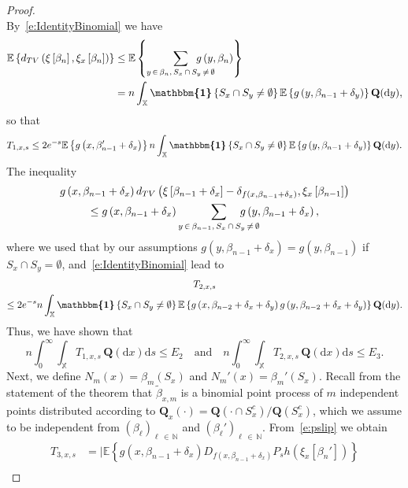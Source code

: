 \documentclass[AHL,Unicode,longabstracts]{cedram}
\newcommand{\bQ}{\mathbf{Q}}
\newcommand*\N{\mathbb{N}}
\newcommand*\X{\mathbb{X}}
\newcommand{\E}{\mathbb{E}}
\newcommand*\md{\mathrm{d}}
\newcommand{\mean}[1] {\E\left\{{#1}\right\}}
\newcommand{\ind}{\boldsymbol{\mathbbm{1}}}
\begin{document}
\begin{proof}
\[\]
By~\eqref{e:IdentityBinomial} we have
\begin{align*}
\mean{d_{TV}\left(\xi\left[\beta_{n}\right],\xi_x\left[\beta_{n}\right]\right)} & \leq \mean{\sum_{y\,\in\,\beta_{n},\,S_x\,\cap\,S_y\,\neq\,\emptyset}\mkern-35mu g\left(y,\beta_{n}\right) } \\
& = n \int_{\X} \ind\left\{S_x\cap S_y \neq \emptyset\right\} \mean{g\left(y,\beta_{n-1}+\delta_y\right)} \bQ(\md y),
\end{align*}
so that
\[
T_{1,x,s} \leq 2 e^{-s} \mean{g\left(x,\beta_{n-1}'+\delta_x\right)} n \int_{\X} \ind\left\{S_x\cap S_y \neq \emptyset\right\} \mean{g\left(y,\beta_{n-1}+\delta_y\right)} \bQ(\md y).
\]
The inequality
\begin{multline*}
g\left(x,\beta_{n-1}+\delta_x\right) d_{TV}\left(\xi\left[\beta_{n-1}+\delta_x\right] -\delta_{f\left(x,\beta_{n-1}+\delta_x\right)},\xi_x\left[\beta_{n-1}\right]\right) \\
\leq g\left(x,\beta_{n-1}+\delta_x\right) \sum_{y\,\in\,\beta_{n-1},\,S_x\,\cap\,S_y\,\neq\,\emptyset}\mkern-35mu g\left(y,\beta_{n-1}+\delta_x\right),
\end{multline*}
where we used that by our assumptions $g(y,\beta_{n-1}+\delta_x)=g(y,\beta_{n-1})$ if $S_x\cap S_y=\emptyset$, and~\eqref{e:IdentityBinomial} lead to
\begin{multline*}
T_{2,x,s}\\
\leq 2 e^{-s} n \int_{\X} \ind\left\{S_x\cap S_y \neq \emptyset\right\} \mean{g\left(x,\beta_{n-2}+\delta_x+\delta_y\right) g\left(y,\beta_{n-2}+\delta_x+\delta_y\right)} \bQ(\md y).
\end{multline*}
Thus, we have shown that
\begin{equation}\label{e:T1+T2}
n \int_0^\infty \int_{\X} T_{1,x,s} \, \bQ(\md x) \md s \leq E_2 \quad \text{and} \quad n \int_0^\infty \int_{\X} T_{2,x,s} \, \bQ(\md x) \md s \leq E_3.
\end{equation}
Next, we define $N_m(x)=\beta_m(S_x)$ and $N_m'(x)=\beta_m'(S_x)$. Recall from the statement of the theorem that $\widetilde{\beta}_{x,m}$ is a binomial point process of $m$ independent points distributed according to $\bQ_x(\cdot)=\bQ(\cdot \cap S_x^c)/\bQ(S_x^c)$, which we assume to be independent from $(\beta_\ell)_{\ell\,\in\,\N}$ and $(\beta_\ell')_{\ell\,\in\,\N}$. From~\eqref{e:pslip} we obtain
\begin{align*}
T_{3,x,s} & = \big| \mean{g\left(x,\beta_{n-1}+\delta_x\right) D_{f\left(x,\beta_{n-1}+\delta_x\right)}P_sh\left(\xi_x\left[\beta_{n}'\right]\right) } \\

\end{align*}
\end{proof}
\end{document}
